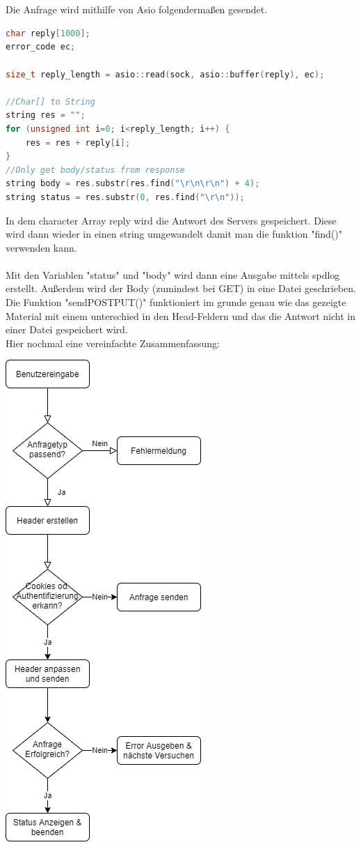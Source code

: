 \documentclass{article}
\begin{document}
\\
\\
Die Anfrage wird mithilfe von Asio folgendermaßen gesendet. 
\begin{lstlisting}[language=C++]
char reply[1000];
error_code ec;

size_t reply_length = asio::read(sock, asio::buffer(reply), ec);

//Char[] to String
string res = "";
for (unsigned int i=0; i<reply_length; i++) {
    res = res + reply[i];
}
//Only get body/status from response
string body = res.substr(res.find("\r\n\r\n") + 4);
string status = res.substr(0, res.find("\r\n"));
\end{lstlisting}
In dem character Array reply wird die Antwort des Servers gespeichert. Diese wird dann wieder in einen string umgewandelt damit man die funktion "find()" verwenden kann.
\\
\\
Mit den Variablen "status" und "body" wird dann eine Ausgabe mittels spdlog erstellt. Außerdem wird der Body (zumindest bei GET) in eine Datei geschrieben. 
\\
Die Funktion "send\textunderscore POST\textunderscore PUT()" funktioniert im grunde genau wie das gezeigte Material mit einem unterschied in den Head-Feldern und das die Antwort nicht in einer Datei gespeichert wird.
\\
Hier nochmal eine vereinfachte Zusammenfassung:
\begin{center}
 \includegraphics[scale=0.6]{ablauf.png}   
\end{center}
\end{document}
